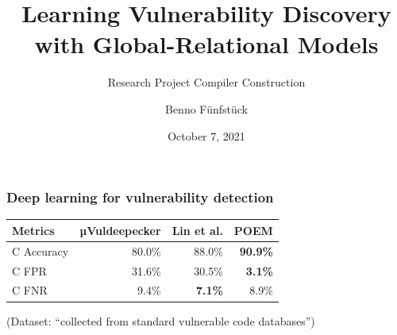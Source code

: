 \documentclass[aspectratio=169,xcolor=table]{beamer}
\title{Learning Vulnerability Discovery with Global-Relational Models}
\subtitle{Research Project Compiler Construction}
\author{Benno Fünfstück}
\date{October 7, 2021}
\begin{document}



\newcommand\makenode[2]{%
  \tikz[baseline=0pt, remember picture] { \node[fill=gray!50,thick,rounded corners,anchor=base,#1/.try] (listings-\the\value{tmlistings}) {{\scriptsize\the\value{tmlistings}} #2}; }%
  \stepcounter{tmlistings}%
}

\begin{frame}[label=current]
  \titlepage
\end{frame}

\begin{frame}[t]\frametitle{Deep learning for vulnerability detection}

  \vspace{10pt}

  \begin{tabular}{lrrr}
    \toprule
    Metrics & µVuldeepecker & Lin et al. & {\bfseries POEM} \\
    \midrule
    C Accuracy & 80.0\% & 88.0\% & \bfseries{90.9\%} \\
    C FPR      & 31.6\% & 30.5\% & \bfseries{3.1\%} \\
    C FNR      & 9.4\%  & \bfseries{7.1\%}  & 8.9\% \\
    \bottomrule
  \end{tabular}

  \vspace{10pt}

  (Dataset: ``collected from standard vulnerable code databases'')

\end{frame}
\end{document}
